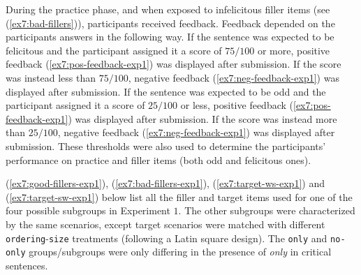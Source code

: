 During the practice phase, and when exposed to infelicitous filler items (see (\ref{ex7:bad-fillers})), participants received feedback. Feedback depended on the participants answers in the following way. If the sentence was expected to be felicitous and the participant assigned it a score of $75/100$ or more, positive feedback (\ref{ex7:pos-feedback-exp1}) was displayed after submission. If the score was instead less than $75/100$, negative feedback (\ref{ex7:neg-feedback-exp1}) was displayed after submission. If the sentence was expected to be odd and the participant assigned it a score of $25/100$ or less, positive feedback (\ref{ex7:pos-feedback-exp1}) was displayed after submission. If the score was instead more than $25/100$, negative feedback (\ref{ex7:neg-feedback-exp1}) was displayed after submission. These thresholds were also used to determine the participants' performance on practice and filler items (both odd and felicitous ones).

\begin{exe}
	\ex\label{ex7:feedback-exp1}
	\begin{xlist}
		\label{ex7:pos-feedback-exp1}
		\label{ex7:neg-feedback-exp1}
	\end{xlist}
\end{exe}


(\ref{ex7:good-fillers-exp1}), (\ref{ex7:bad-fillers-exp1}), (\ref{ex7:target-ws-exp1}) and (\ref{ex7:target-sw-exp1}) below list all the filler and target items used for one of the four possible subgroups in Experiment $1$. The other subgroups were characterized by the same scenarios, except target scenarios were matched with different \texttt{ordering}-\texttt{size} treatments (following a Latin square design). The \texttt{only} and \texttt{no-only} groups/subgroups were only differing in the presence of \textit{only} in critical sentences.
 
